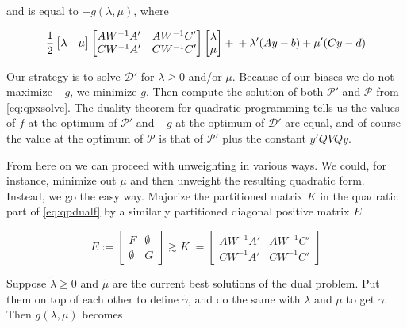 \documentclass[
  12pt,
]{book}
\theoremstyle{definition}
\theoremstyle{definition}
\theoremstyle{definition}
\theoremstyle{definition}
\theoremstyle{remark}
\begin{document}
and is equal to \(-g(\lambda,\mu)\), where

\begin{equation}
\frac12\begin{bmatrix}\lambda&\mu\end{bmatrix}
\begin{bmatrix}AW^{-1}A'&AW^{-1}C'\\CW^{-1}A'&CW^{-1}C'\end{bmatrix}\begin{bmatrix}\lambda\\\mu\end{bmatrix}+\\
+\lambda'(Ay-b)\\
+\mu'(Cy-d)
\label{eq:qpdualf}
\end{equation}

Our strategy is to solve \(\mathcal{D'}\) for \(\lambda\geq 0\) and/or \(\mu\). Because of our biases we do not maximize \(-g\), we minimize \(g\). Then
compute the solution of both \(\mathcal{P}'\) and \(\mathcal{P}\) from
\eqref{eq:qpxsolve}. The duality theorem for quadratic programming tells us the
values of \(f\) at the optimum of \(\mathcal{P}'\) and \(-g\) at the optimum of \(\mathcal{D}'\) are equal, and of course the value at the optimum of \(\mathcal{P}\)
is that of \(\mathcal{P}'\) plus the constant \(y'QVQy\).

From here on we can proceed with unweighting in various ways. We could, for instance, minimize out \(\mu\) and then unweight the resulting quadratic form. Instead, we go the easy way. Majorize the partitioned matrix \(K\) in the quadratic part of \eqref{eq:qpdualf} by a similarly partitioned diagonal positive matrix \(E\).

\begin{equation}
E:=\begin{bmatrix}F&\emptyset\\\emptyset&G\end{bmatrix}\gtrsim K:=\begin{bmatrix}AW^{-1}A'&AW^{-1}C'\\CW^{-1}A'&CW^{-1}C'\end{bmatrix}
\label{eq:qpdumaj}
\end{equation}

Suppose \(\tilde\lambda\geq 0\) and \(\tilde\mu\) are the current best solutions of the dual problem. Put them on top of each other to define \(\tilde\gamma\), and do the same with \(\lambda\) and \(\mu\) to get \(\gamma\). Then \(g(\lambda,\mu)\) becomes
\end{document}
